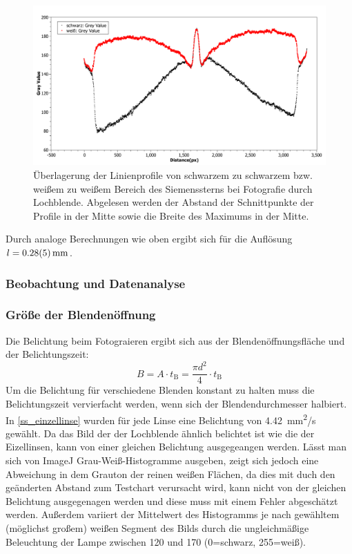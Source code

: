 \documentclass[
	a4paper,
	12pt,
	pagesize,
	ngerman
]{scrartcl}
\begin{document}
	\begin{figure}[H]  
		\includegraphics[width=1\textwidth]{fig_lochblende}
		\centering
		\caption{
		Überlagerung der Linienprofile von schwarzem zu schwarzem bzw. weißem zu weißem Bereich des Siemenssterns bei Fotografie durch Lochblende.
		Abgelesen werden der Abstand der Schnittpunkte der Profile in der Mitte sowie die Breite des Maximums in der Mitte.
		}
		\label{fig_lochblende_profil}
		\centering
	\end{figure}
	
	Durch analoge Berechnungen wie oben ergibt sich für die Auflösung $l = \SI{0.28\pm 0.05}{mm}$.
	
	\subsubsection{Beobachtung und Datenanalyse}




	\subsubsection*{Größe der Blendenöffnung}
	Die Belichtung beim Fotograieren ergibt sich aus der Blendenöffnungsfläche und der Belichtungszeit:
	\begin{equation}
		B = A \cdot t_\text{B} = \frac{\pi d^2}{4} \cdot t_\text{B}
	\end{equation}
	Um die Belichtung für verschiedene Blenden konstant zu halten muss die Belichtungszeit vervierfacht werden, wenn sich der Blendendurchmesser halbiert.
	In \cref{ss_einzellinse} wurden für jede Linse eine Belichtung von \SI{4,42}{mm^2/s} gewählt.
	Da das Bild der der Lochblende ähnlich belichtet ist wie die der Eizellinsen, kann von einer gleichen Belichtung ausgegeangen werden.
	Lässt man sich von ImageJ Grau-Weiß-Histogramme ausgeben, zeigt sich jedoch eine Abweichung in dem Grauton der reinen weißen Flächen, da dies mit duch den geänderten Abstand zum Testchart verursacht wird, kann nicht von der gleichen Belichtung ausgegenagen werden und diese muss mit einem Fehler abgeschätzt werden.
	Außerdem variiert der Mittelwert des Histogramms je nach gewähltem (möglichst großem) weißen Segment des Bilds durch die ungleichmäßige Beleuchtung der Lampe zwischen 120 und 170 (0=schwarz, 255=weiß).
\end{document}
